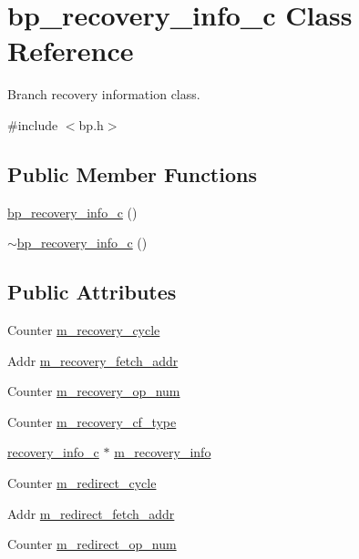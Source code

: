 \hypertarget{classbp__recovery__info__c}{
\section{bp\_\-recovery\_\-info\_\-c Class Reference}
\label{classbp__recovery__info__c}
}


Branch recovery information class.  




{\ttfamily \#include $<$bp.h$>$}

\subsection*{Public Member Functions}
\begin{DoxyCompactItemize}
\item 
\hyperlink{classbp__recovery__info__c_a04e835b432804f946b1a846240e176ba}{bp\_\-recovery\_\-info\_\-c} ()
\item 
\hyperlink{classbp__recovery__info__c_a23043b47ebad45830826a086b9ff839a}{$\sim$bp\_\-recovery\_\-info\_\-c} ()
\end{DoxyCompactItemize}
\subsection*{Public Attributes}
\begin{DoxyCompactItemize}
\item 
Counter \hyperlink{classbp__recovery__info__c_a00230943e8204144e777bd49d036f9df}{m\_\-recovery\_\-cycle}
\item 
Addr \hyperlink{classbp__recovery__info__c_a6dfab69054850067ef95b38faf85cec1}{m\_\-recovery\_\-fetch\_\-addr}
\item 
Counter \hyperlink{classbp__recovery__info__c_a4d165d8ea37c2a80f93385010f780b93}{m\_\-recovery\_\-op\_\-num}
\item 
Counter \hyperlink{classbp__recovery__info__c_afdb299ba15294f1f1681f8e363ffcdbd}{m\_\-recovery\_\-cf\_\-type}
\item 
\hyperlink{classrecovery__info__c}{recovery\_\-info\_\-c} $\ast$ \hyperlink{classbp__recovery__info__c_a8addc9c062b96ddfdec35d817d215117}{m\_\-recovery\_\-info}
\item 
Counter \hyperlink{classbp__recovery__info__c_ae42bca851549fbe1dfbb3b3bb02854af}{m\_\-redirect\_\-cycle}
\item 
Addr \hyperlink{classbp__recovery__info__c_aa037c488f3aec47db7b5b19eed5ee682}{m\_\-redirect\_\-fetch\_\-addr}
\item 
Counter \hyperlink{classbp__recovery__info__c_ad7f574a8e5006bc0f34757bfcd0642b7}{m\_\-redirect\_\-op\_\-num}
\end{DoxyCompactItemize}


